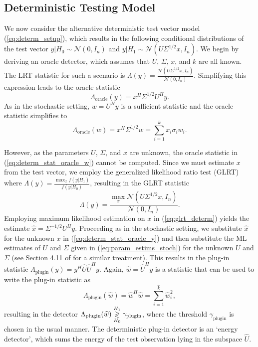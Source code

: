\subsection{Deterministic Testing Model}\label{sec:plugin_determ}
We now consider the alternative deterministic test vector model (\ref{eq:determ_setup}), which results in the following conditional distributions of the test vector $y|H_0\sim\mathcal{N}(0,I_n)$ and $y|H_1\sim\mathcal{N}(U\Sigma^{1/2} x, I_n)$. We begin by deriving an oracle detector, which assumes that $U$, $\Sigma$, $x$, and $k$ are all known. The LRT statistic for such a scenario is $\Lambda(y) = \frac{\mathcal{N}(U\Sigma^{1/2} x, I_n)}{\mathcal{N}(0,I_n)}$. Simplifying this expression leads to the oracle statistic
\begin{equation}\label{eq:determ_stat_oracle_y}
\Lambda_{\text{oracle}}(y) = x^H\Sigma^{1/2}U^Hy.
\end{equation}
As in the stochastic setting, $w=U^Hy$ is a sufficient statistic and the oracle statistic simplifies to
\begin{equation}\label{eq:determ_stat_oracle_w}
\boxed{\Lambda_{\text{oracle}}(w) = x^H\Sigma^{1/2}w = \sum_{i=1}^kx_i\sigma_iw_i.}
\end{equation}

However, as the parameters $U$, $\Sigma$, and $x$  are unknown, the oracle statistic in (\ref{eq:determ_stat_oracle_w}) cannot be computed. Since we must estimate $x$ from the test vector, we employ the generalized likelihood ratio test (GLRT) where $\Lambda(y) = \frac{\max_x f(y|H_1)}{f(y|H_0)}$, resulting in the GLRT statistic
\begin{equation}\label{eq:glrt_determ}
\Lambda(y)=\frac{\max_x\mathcal{N}(U\Sigma^{1/2} x,I_n)}{\mathcal{N}(0,I_n)}.
\end{equation}
Employing maximum likelihood estimation on $x$ in (\ref{eq:glrt_determ}) yields the estimate $\widehat{x}=\Sigma^{-1/2}U^Hy$.  Proceeding as in the stochastic setting, we substitute $\widehat{x}$ for the unknown $x$ in (\ref{eq:determ_stat_oracle_y}) and then substitute the ML estimates of $U$ and $\Sigma$ given in (\ref{eq:param_estims_stoch}) for the unknown $U$ and $\Sigma$ (see Section 4.11 of \cite{scharf1991statistical} for a similar treatment). This results in the plug-in statistic $\Lambda_{\text{plugin}}(y) = y^H\widehat{U}\widehat{U}^Hy$. Again, $\widehat{w}=\widehat{U}^Hy$ is a statistic that can be used to write the plug-in statistic as
\begin{equation}\label{eq:plugin_stat_determ}
\boxed{\Lambda_{\text{plugin}}(\widehat{w}) = \widehat{w}^H\widehat{w}=\sum_{i=1}^{\widehat{k}}\widehat{w}_i^2},
\end{equation}
resulting in the detector $\Lambda_{\text{plugin}}(\widehat{w}) \overset{H_1}{\underset{H_0}{\gtrless}} \gamma_{\text{plugin}}$, 
where the threshold $\gamma_{\text{plugin}}$ is chosen in the usual manner. The deterministic plug-in detector is an `energy detector', which sums the energy of the test observation lying in the subspace $\widehat{U}$.

